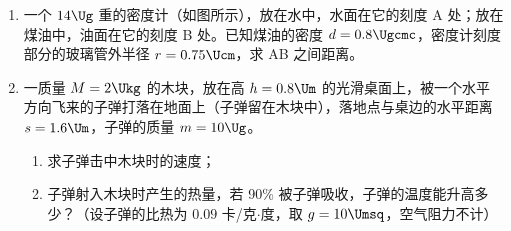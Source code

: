 \documentclass[\gkver]{gaokaozhenti}
\begin{document}
\begin{enumerate}
{评分标准：全题 13 分，（1）5 分；（2）两表的量程各 4 分，共 8 分。
}

\item
一个 $14\Ug$ 重的密度计（如图所示），放在水中，水面在它的刻度 A 处；放在煤油中，油面在它的刻度 B 处。已知煤油的密度 $d=0.8\Ugcmc$，密度计刻度部分的玻璃管外半径 $r=0.75\Ucm$，求 AB 之间距离。

\jdanswer{
$2\Ucm$
}


\item
一质量 $M=2\Ukg$ 的木块，放在高 $h=0.8\Um$ 的光滑桌面上，被一个水平方向飞来的子弹打落在地面上（子弹留在木块中），落地点与桌边的水平距离 $s=1.6\Um$，子弹的质量 $m=10\Ug$。

\begin{enumerate}
	\item
	求子弹击中木块时的速度；
	\item
	子弹射入木块时产生的热量，若 90\% 被子弹吸收，子弹的温度能升高多少？（设子弹的比热为 $0.09$ 卡/克$\cdot$度，取 $g=10\Umsq$，空气阻力不计）
\end{enumerate}

\jdanswer{
\begin{enumerate}
	\item
	$804\Ums$

	\item
	$772\UdC$
\end{enumerate}
}


\end{enumerate}
\end{document}
